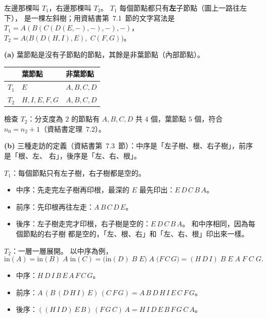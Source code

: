 \begin{pastsoln}
左邊那棵叫 $T_1$，右邊那棵叫 $T_2$。 $T_1$ 每個節點都只有\textbf{左}子節點（圖上一路往左下），
是一棵左斜樹；用資結書第~7.1~節的文字寫法是 $T_1 = A(B(C(D(E, -), -), -), -)$，
$T_2 = A\bigl(B(D(H, I), E),\; C(F, G)\bigr)$。

\textbf{(a)} 葉節點是沒有子節點的節點，其餘是非葉節點（內部節點）。
\begin{center}
\begin{tabular}{lll}
\toprule
 & 葉節點 & 非葉節點 \\
\midrule
$T_1$ & $E$ & $A, B, C, D$ \\
$T_2$ & $H, I, E, F, G$ & $A, B, C, D$ \\
\bottomrule
\end{tabular}
\end{center}
檢查 $T_2$：分支度為 $2$ 的節點有 $A, B, C, D$ 共 $4$ 個，葉節點 $5$ 個，符合
$n_0 = n_2 + 1$（資結書定理~7.2）。

\textbf{(b)} 三種走訪的定義（資結書第~7.3~節）：中序是「左子樹、根、右子樹」，前序是「根、左、
右」，後序是「左、右、根」。

$T_1$：每個節點只有左子樹，右子樹都是空的。
\begin{itemize}
\item 中序：先走完左子樹再印根，最深的 $E$ 最先印出：$E\,D\,C\,B\,A$。
\item 前序：先印根再往左走：$A\,B\,C\,D\,E$。
\item 後序：左子樹走完才印根，右子樹是空的：$E\,D\,C\,B\,A$。 和中序相同，因為每個節點的右子樹
都是空的，「左、根、右」和「左、右、根」印出來一樣。
\end{itemize}

$T_2$：一層一層展開。 以中序為例，
\[
\mathrm{in}(A) = \mathrm{in}(B)\; A\; \mathrm{in}(C)
= \bigl(\mathrm{in}(D)\; B\; E\bigr)\; A\; \bigl(F\, C\, G\bigr)
= (H\,D\,I)\; B\; E\; A\; F\; C\; G .
\]
\begin{itemize}
\item 中序：$H\,D\,I\,B\,E\,A\,F\,C\,G$。
\item 前序：$A\,(B\,(D\,H\,I)\,E)\,(C\,F\,G) = A\,B\,D\,H\,I\,E\,C\,F\,G$。
\item 後序：$((H\,I\,D)\,E\,B)\,(F\,G\,C)\,A = H\,I\,D\,E\,B\,F\,G\,C\,A$。
\end{itemize}
\end{pastsoln}
